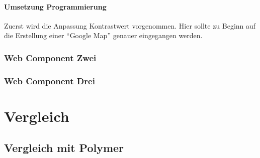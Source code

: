 \documentclass[12pt, paper=a4, bibtotoc, toc=listof, headsepline=true]{scrreprt}
\begin{document}
			\subsubsection{Umsetzung Programmierung}
			Zuerst wird die Anpassung Kontrastwert vorgenommen. Hier sollte zu Beginn auf die Erstellung einer \enquote{Google Map} genauer eingegangen werden.
		\subsection{Web Component Zwei}
		\subsection{Web Component Drei}
\chapter{Vergleich}
	\section{Vergleich mit Polymer}
	

	\printbibliography
\end{document}
